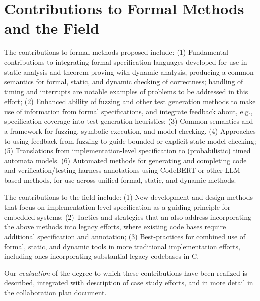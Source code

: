 \section{Contributions to Formal Methods and the Field}

The contributions to formal methods proposed include: (1)
Fundamental contributions to integrating formal specification
languages developed for use in static analysis and theorem proving
with dynamic analysis, producing a common semantics for formal,
static, and dynamic checking of correctness; handling of timing and
interrupts are notable examples of problems to be addressed in this effort;
(2) Enhanced ability of fuzzing and other test generation methods to
make use of information from formal specifications, and integrate
feedback about, e.g., specification coverage into test generation
heuristics;
(3) Common semantics and a framework for fuzzing, symbolic execution,
and model checking.
(4) Approaches to using feedback from fuzzing to guide bounded or explicit-state model
checking;
(5) Translations from implementation-level specification to
(probabilistic) timed automata models.
(6) Automated methods for generating and completing code and
verification/testing harness annotations using CodeBERT or other
LLM-based methods, for use across unified formal, static, and dynamic methods.

The contributions to the field include:
(1)  New development and design methods that focus on
implementation-level specification as a guiding
principle for embedded systems; (2) Tactics and strategies that an
also address incorporating the above methods into
legacy efforts, where existing code bases require additional
specification and annotation; (3) Best-practices for combined use of formal, static, and dynamic tools in
more traditional implementation efforts, including ones incorporating
substantial legacy codebases in C.


Our \emph{evaluation} of the degree to which these contributions have
been realized is described, integrated with
description of case study efforts, and in more detail in the
collaboration plan document.